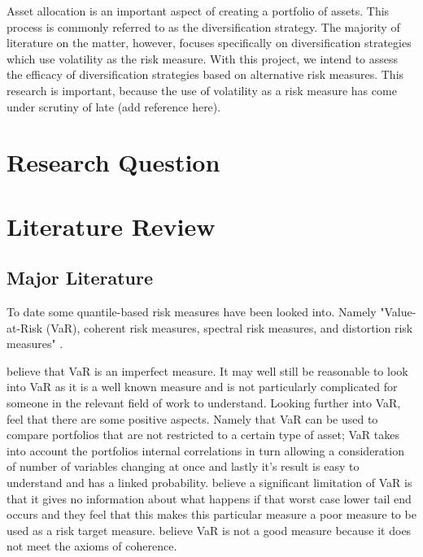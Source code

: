 \documentclass[12pt,a4paper]{article}
\begin{document}
Asset allocation is an important aspect of creating a portfolio of assets. This process is commonly referred to as the diversification strategy. The majority of literature on the matter, however, focuses specifically on diversification strategies which use volatility as the risk measure. With this project, we intend to assess the efficacy of diversification strategies based on alternative risk measures.
This research is important, because the use of volatility as a risk measure has come under scrutiny of late (add reference here).




\section{Research Question}
\label{sec:ResQues}


\section{Literature Review}
\label{sec:LitRev}

\subsection{Major Literature}
\label{subsec:MajLit}
To date some quantile-based risk measures have been looked into. Namely "Value-at-Risk (VaR), coherent risk measures, spectral risk measures, and distortion risk measures" \citep{dowd2006after}.

 \cite{dowd2006after} believe that VaR is an imperfect measure. It may well still be reasonable to look into VaR as it is a well known measure and is not particularly complicated for someone in the relevant field of work to understand. Looking further into VaR, \cite{dowd2006after} feel that there are some positive aspects. Namely that VaR can be used to compare portfolios that are not restricted to a certain type of asset; VaR takes into account the portfolios internal correlations in turn allowing a consideration of number of variables changing at once and lastly it's result is easy to understand and has a linked probability.  \cite{dowd2006after} believe a significant limitation of VaR is that it gives no information about what happens if that worst case lower tail end occurs and they feel that this makes this particular measure a poor measure to be used as a risk target measure. \cite{ACERBI20021505} believe VaR is not a good measure because it does not meet the axioms of coherence.
\end{document}
